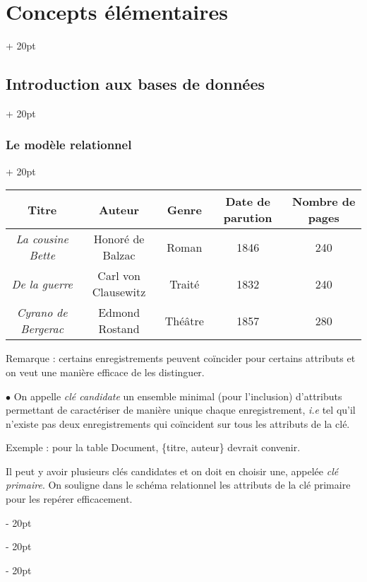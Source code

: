 \documentclass[a4paper, 12pt, twoside]{article}
\newcommand{\ind}[1][20pt]{\advance\leftskip + #1}
\newcommand{\deind}[1][20pt]{\advance\leftskip - #1}
\newenvironment{indt}[2][20pt]{#2 \par \ind[#1]}{\par \deind} %
\begin{document}
\begin{indt}{\section{Concepts élémentaires}}
\begin{indt}{\subsection{Introduction aux bases de données}}
\begin{indt}{\subsubsection{Le modèle relationnel}}
                \begin{tabular}{|c|c|c|c|c|}
                    \hline
                    Titre
                    & Auteur
                    & Genre
                    & Date de parution
                    & Nombre de pages
                    \\
                    \hline
                    \textit{La cousine Bette}
                    & Honoré de Balzac
                    & Roman
                    & 1846
                    & 240
                    \\
                    \textit{De la guerre}
                    & Carl von Clausewitz
                    & Traité
                    & 1832
                    & 240
                    \\
                    \textit{Cyrano de Bergerac}
                    & Edmond Rostand
                    & Théâtre
                    & 1857
                    & 280
                    \\
                    \hline
                \end{tabular}
                
                \vspace{12pt}
                
                Remarque : certains enregistrements peuvent coïncider pour certains attributs et on veut une manière efficace de les distinguer.
                
                \vspace{12pt}
                
                $\bullet$ On appelle \textit{clé candidate} un ensemble minimal (pour l'inclusion) d'attributs permettant de caractériser de manière unique chaque enregistrement, \textit{i.e} tel qu'il n'existe pas deux enregistrements qui coïncident sur tous les attributs de la clé.
                
                \vspace{6pt}
                
                Exemple : pour la table Document, \{titre, auteur\} devrait convenir.
                
                \vspace{6pt}
                
                Il peut y avoir plusieurs clés candidates et on doit en choisir une, appelée \textit{clé primaire}. On souligne dans le schéma relationnel les attributs de la clé primaire pour les repérer efficacement.
                

\end{indt}
\end{indt}
\end{indt}
\end{document}
